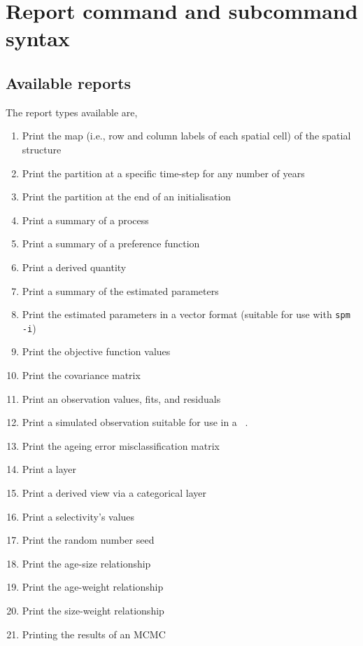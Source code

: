 \section{Report command and subcommand syntax\label{sec:report-syntax}}

\subsection{Available reports}

The report types available are,

\begin{enumerate}
  \item Print the map (i.e., row and column labels of each spatial cell) of the spatial structure
  \item Print the partition at a specific time-step for any number of years
  \item Print the partition at the end of an initialisation
  \item Print a summary of a process
	\item Print a summary of a preference function
  \item Print a derived quantity
  \item Print a summary of the estimated parameters
  \item Print the estimated parameters in a vector format (suitable for use with \texttt{spm -i})
  \item Print the objective function values
  \item Print the covariance matrix
  \item Print an observation values, fits, and residuals
  \item Print a simulated observation suitable for use in a \SPM\ \config.
  \item Print the ageing error misclassification matrix
  \item Print a layer
  \item Print a derived view via a categorical layer
  \item Print a selectivity's values
  \item Print the random number seed
  \item Print the age-size relationship
  \item Print the age-weight relationship
  \item Print the size-weight relationship
  \item Printing the results of an MCMC
\end{enumerate}

